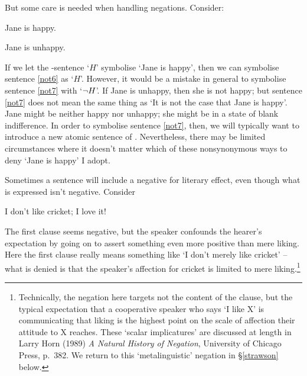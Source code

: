 But some care is needed when handling negations. Consider:
	\begin{earg}
		\item[\ex{not6}] Jane is happy.
		\item[\ex{not7}] Jane is unhappy.
	\end{earg}
If we let the \TFL-sentence `$H$' symbolise  `Jane is happy', then we can symbolise sentence \ref{not6} as `$H$'. However, it would be a mistake in general to symbolise sentence \ref{not7} with `$\neg{H}$'. If Jane is unhappy, then she is not happy; but sentence \ref{not7} does not mean the same thing as `It is not the case that Jane is happy'. Jane might be neither happy nor unhappy; she might be in a state of blank indifference. In order to symbolise sentence \ref{not7}, then, we will typically want to introduce a new atomic sentence of \TFL. Nevertheless, there may be limited circumstances where it doesn't matter which of these nonsynonymous ways to deny `Jane is happy' I adopt.

Sometimes a sentence will include a negative for literary effect, even though what is expressed isn't negative. Consider \begin{earg}
	\item[\ex{sc.imp}] I don't like cricket; I love it!
\end{earg} The first clause seems negative, but the speaker confounds the hearer's expectation by going on to assert something even more positive than mere liking. Here the first clause really means something like `I don't merely like cricket' – what is denied is that the speaker's affection for cricket is limited to mere liking.\footnote{Technically, the negation here targets not the content of the clause, but the typical expectation that a cooperative speaker who says `I like X' is communicating that liking is the highest point on the scale of affection their attitude to X reaches. These `scalar implicatures' are discussed at length in Larry Horn (1989) \emph{A Natural History of Negation}, University of Chicago Press, p.\ 382. We return to this `metalinguistic' negation in §\ref{strawson} below.}


